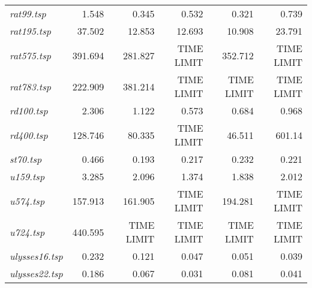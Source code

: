 {\begin{longtable}[H]{lrrrrr}
\textit{rat99.tsp} & 1.548 & 0.345 & 0.532 & 0.321 & 0.739\\
\textit{rat195.tsp} & 37.502 & 12.853 & 12.693 & 10.908 & 23.791\\
\textit{rat575.tsp} & 391.694 & 281.827 & TIME LIMIT & 352.712 & TIME LIMIT\\
\textit{rat783.tsp} & 222.909 & 381.214 & TIME LIMIT & TIME LIMIT & TIME LIMIT\\
\textit{rd100.tsp} & 2.306 & 1.122 & 0.573 & 0.684 & 0.968\\
\textit{rd400.tsp} & 128.746 & 80.335 & TIME LIMIT & 46.511 & 601.14\\
\textit{st70.tsp} & 0.466 & 0.193 & 0.217 & 0.232 & 0.221\\
\textit{u159.tsp} & 3.285 & 2.096 & 1.374 & 1.838 & 2.012\\
\textit{u574.tsp} & 157.913 & 161.905 & TIME LIMIT & 194.281 & TIME LIMIT\\
\textit{u724.tsp} & 440.595 & TIME LIMIT & TIME LIMIT & TIME LIMIT & TIME LIMIT\\
\textit{ulysses16.tsp} & 0.232 & 0.121 & 0.047 & 0.051 & 0.039\\
\textit{ulysses22.tsp} & 0.186 & 0.067 & 0.031 & 0.081 & 0.041\\
\hline
\end{longtable}
}

